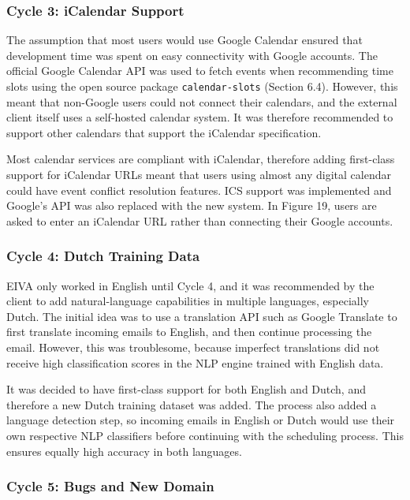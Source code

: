 \documentclass{article}
\begin{document}
\subsubsection{Cycle 3: iCalendar Support}

The assumption that most users would use Google Calendar ensured that development time was spent on easy connectivity with Google accounts. The official Google Calendar API was used to fetch events when recommending time slots using the open source package \texttt{calendar-slots} (Section 6.4). However, this meant that non-Google users could not connect their calendars, and the external client itself uses a self-hosted calendar system. It was therefore recommended to support other calendars that support the iCalendar specification.

Most calendar services are compliant with iCalendar, therefore adding first-class support for iCalendar URLs meant that users using almost any digital calendar could have event conflict resolution features. ICS support was implemented and Google's API was also replaced with the new system. In Figure 19, users are asked to enter an iCalendar URL rather than connecting their Google accounts.

\subsubsection{Cycle 4: Dutch Training Data}

EIVA only worked in English until Cycle 4, and it was recommended by the client to add natural-language capabilities in multiple languages, especially Dutch. The initial idea was to use a translation API such as Google Translate to first translate incoming emails to English, and then continue processing the email. However, this was troublesome, because imperfect translations did not receive high classification scores in the NLP engine trained with English data.

It was decided to have first-class support for both English and Dutch, and therefore a new Dutch training dataset was added. The process also added a language detection step, so incoming emails in English or Dutch would use their own respective NLP classifiers before continuing with the scheduling process. This ensures equally high accuracy in both languages.

\subsubsection{Cycle 5: Bugs and New Domain}
\end{document}
